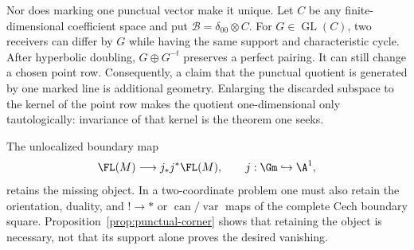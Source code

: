 Nor does marking one punctual vector make it unique.  Let \(C\) be any
finite-dimensional coefficient space and put
\(\mathcal B=\delta_{00}\otimes C\).  For
\(G\in\operatorname{GL}(C)\), two receivers can differ by \(G\) while
having the same support and characteristic cycle.  After hyperbolic doubling,
\(G\oplus G^{-t}\) preserves a perfect pairing.  It can still change a chosen
point row.  Consequently, a claim that the punctual quotient is generated by
one marked line is additional geometry.  Enlarging the discarded subspace to
the kernel of the point row makes the quotient one-dimensional only
tautologically: invariance of that kernel is the theorem one seeks.

The unlocalized boundary map
\begin{equation}\label{eq:unlocalized-boundary-map}
 \FL(M)\longrightarrow j_*j^*\FL(M),\qquad
 j:\Gm\hookrightarrow\A^1,
\end{equation}
retains the missing object.  In a two-coordinate problem one must also retain
the orientation, duality, and \(!\to *\) or
\(\operatorname{can}/\operatorname{var}\) maps of the complete Cech boundary
square.  Proposition~\ref{prop:punctual-corner} shows that retaining the
object is necessary, not that its support alone proves the desired vanishing.
